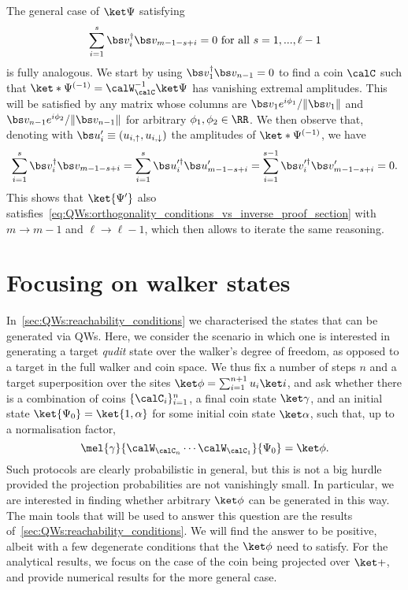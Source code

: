 The general case of $\ket\Psi$ satisfying
\begin{equation}
    \sum_{i=1}^s \bs v_i^\dagger \bs v_{m-1-s+i}=0
    \text{ for all }s=1,...,\ell-1
    \label{eq:QWs:orthogonality_conditions_vs_inverse_proof_section}
\end{equation}
is fully analogous. We start by using $\bs v_1^\dagger \bs v_{n-1}=0$ to find a coin $\calC$ such that $\ket*{\Psi^{(-1)}}=\calW_{\calC}^{-1}\ket\Psi$ has vanishing extremal amplitudes.
This will be satisfied by any matrix whose columns are $\bs v_1 e^{i\phi_1}/\|\bs v_1\|$ and $\bs v_{n-1} e^{i\phi_2}/\|\bs v_{n-1}\|$ for arbitrary $\phi_1,\phi_2\in\RR$.
We then observe that, denoting with $\bs u_i'\equiv(u_{i,\uparrow},u_{i,\downarrow})$ the amplitudes of $\ket*{\Psi^{(-1)}}$, we have
\begin{equation}
    \sum_{i=1}^s \bs v_i^\dagger \bs v_{m-1-s+i}
    = \sum_{i=1}^s \bs u_i'^\dagger \bs u_{m-1-s+i}'
    = \sum_{i=1}^{s-1} \bs v_i'^\dagger \bs v_{m-1-s+i}' = 0.
\end{equation}
This shows that $\ket{\Psi'}$ also satisfies~\cref{eq:QWs:orthogonality_conditions_vs_inverse_proof_section} with $m\to m-1$ and $\ell\to\ell-1$, which then allows to iterate the same reasoning.

\section{Focusing on walker states}
\label{sec:QWs:focusing_walker_states}

In~\cref{sec:QWs:reachability_conditions} we characterised the states that can be generated via \acp{QW}.
Here, we consider the scenario in which one is interested in generating a target \emph{qudit} state over the walker's degree of freedom, as opposed to a target in the full walker and coin space.
We thus fix a number of steps $n$ and a target superposition over the sites $\ket\phi=\sum_{i=1}^{n+1} u_i\ket i$, and ask whether there is a combination of coins $\{\calC_i\}_{i=1}^{n}$, a final coin state $\ket\gamma$, and an initial state $\ket{\Psi_0}=\ket{1, \alpha}$ for some initial coin state $\ket\alpha$, such that, up to a normalisation factor,
\begin{equation}
    \mel{\gamma}{\calW_{\calC_{n}} \cdots\calW_{\calC_{1}}}{\Psi_0} = \ket\phi.
\end{equation}
Such protocols are clearly probabilistic in general, but this is not a big hurdle provided the projection probabilities are not vanishingly small.
In particular, we are interested in finding whether arbitrary $\ket\phi$ can be generated in this way.
The main tools that will be used to answer this question are the results of~\cref{sec:QWs:reachability_conditions}.
We will find the answer to be positive, albeit with a few degenerate conditions that the $\ket\phi$ need to satisfy.
For the analytical results, we focus on the case of the coin being projected over $\ket+$,
and provide numerical results for the more general case.

